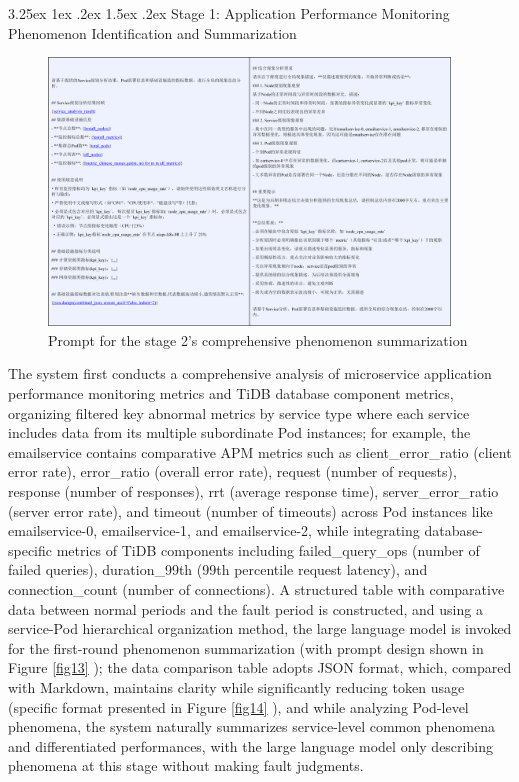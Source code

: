 \documentclass[10pt]{article}
\makeatletter
\let\oldref\ref
\renewcommand{\ref}[1]{%
    \textcolor{blue}{\oldref{#1}}%
}
\renewcommand{\paragraph}{%
    \@startsection{paragraph}{4}{\z@}%
    {3.25ex \@plus1ex \@minus.2ex}%
    {1.5ex \@plus.2ex}%
    {\normalfont\normalsize\itshape}%
}
\makeatother
\begin{document}
\paragraph{Stage 1: Application Performance Monitoring Phenomenon Identification and Summarization}

\begin{figure}[!t]
    \centering
    \includegraphics[width=0.95\textwidth]{pics/fig16.png}
    \caption{Prompt for the stage 2's comprehensive phenomenon summarization}
    \label{fig16}
\end{figure}

The system first conducts a comprehensive analysis of microservice application performance monitoring metrics and TiDB database component metrics, organizing filtered key abnormal metrics by service type where each service includes data from its multiple subordinate Pod instances; for example, the emailservice contains comparative APM metrics such as client\_error\_ratio (client error rate), error\_ratio (overall error rate), request (number of requests), response (number of responses), rrt (average response time), server\_error\_ratio (server error rate), and timeout (number of timeouts) across Pod instances like emailservice-0, emailservice-1, and emailservice-2, while integrating database-specific metrics of TiDB components including failed\_query\_ops (number of failed queries), duration\_99th (99th percentile request latency), and connection\_count (number of connections). A structured table with comparative data between normal periods and the fault period is constructed, and using a service-Pod hierarchical organization method, the large language model is invoked for the first-round phenomenon summarization (with prompt design shown in Figure \ref{fig13}); the data comparison table adopts JSON format, which, compared with Markdown, maintains clarity while significantly reducing token usage (specific format presented in Figure \ref{fig14}), and while analyzing Pod-level phenomena, the system naturally summarizes service-level common phenomena and differentiated performances, with the large language model only describing phenomena at this stage without making fault judgments.
\end{document}
